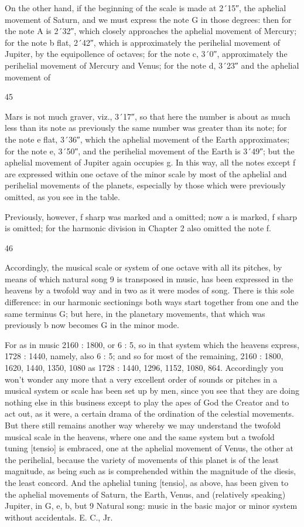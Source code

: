 \documentclass{article}
\begin{document}
On the other hand, if the beginning of the scale is made at 2´15″, the
aphelial movement of Saturn, and we must express the note G in those
degrees: then for the note A is 2´32″, which closely approaches the
aphelial movement of Mercury; for the note b flat, 2´42″, which is
approximately the perihelial movement of Jupiter, by the equipollence of
octaves; for the note c, 3´0″, approximately the perihelial movement of
Mercury and Venus; for the note d, 3´23″ and the aphelial movement of


45

Mars is not much graver, viz., 3´17″, so that here the number is about as
much less than its note as previously the same number was greater than
its note; for the note e flat, 3´36″, which the aphelial movement of the
Earth approximates; for the note e, 3´50″, and the perihelial movement
of the Earth is 3´49″; but the aphelial movement of Jupiter again
occupies g. In this way, all the notes except f are expressed within one
octave of the minor scale by most of the aphelial and perihelial
movements of the planets, especially by those which were previously
omitted, as you see in the table.

Previously, however, f sharp was marked and a omitted; now a is
marked, f sharp is omitted; for the harmonic division in Chapter 2 also
omitted the note f.


46

Accordingly, the musical scale or system of one octave with all its
pitches, by means of which natural song 9 is transposed in music, has
been expressed in the heavens by a twofold way and in two as it were
modes of song. There is this sole difference: in our harmonic sectionings
both ways start together from one and the same terminus G; but here, in
the planetary movements, that which was previously b now becomes G in
the minor mode.

For as in music 2160 : 1800, or 6 : 5, so in that system which the heavens
express, 1728 : 1440, namely, also 6 : 5; and so for most of the
remaining, 2160 : 1800, 1620, 1440, 1350, 1080 as 1728 : 1440, 1296,
1152, 1080, 864.
Accordingly you won't wonder any more that a very excellent order of
sounds or pitches in a musical system or scale has been set up by men,
since you see that they are doing nothing else in this business except to
play the apes of God the Creator and to act out, as it were, a certain
drama of the ordination of the celestial movements.
But there still remains another way whereby we may understand the
twofold musical scale in the heavens, where one and the same system but
a twofold tuning [tensio] is embraced, one at the aphelial movement of
Venus, the other at the perihelial, because the variety of movements of
this planet is of the least magnitude, as being such as is comprehended
within the magnitude of the diesis, the least concord. And the aphelial
tuning [tensio], as above, has been given to the aphelial movements of
Saturn, the Earth, Venus, and (relatively speaking) Jupiter, in G, e, b, but
9 Natural song: music in the basic major or minor system without accidentals. E. C., Jr.
\end{document}
